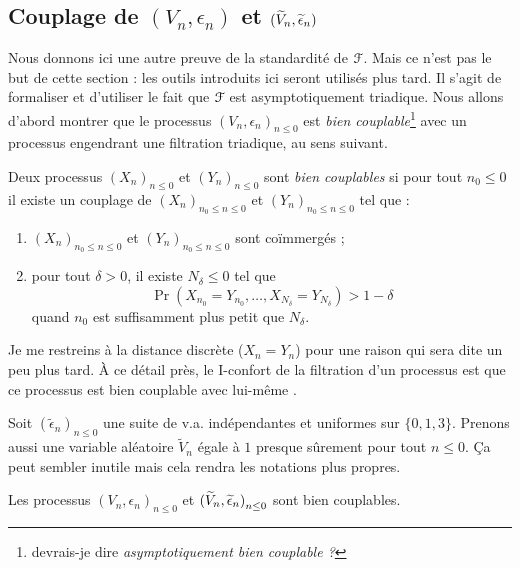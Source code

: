 \documentclass[12pt,a4paper]{article}
\begin{document}
\subsection{Couplage de $(V_n,\epsilon_n)$ et $(\widetilde{V}_n, \widetilde{\epsilon}_n)$}

Nous donnons ici une autre preuve de la standardité de $\EuScript{F}$. 
Mais ce n'est pas le but de cette section : 
les outils introduits ici seront utilisés plus tard.  
Il s'agit de formaliser et d'utiliser le fait que $\EuScript{F}$ est asymptotiquement 
triadique. 
Nous allons d'abord montrer que le processus ${(V_n, \epsilon_n)}_{n \leq 0}$ 
est \emph{bien couplable}\footnote{devrais-je dire \emph{asymptotiquement bien couplable ?}} 
avec un processus engendrant une filtration triadique, 
au sens suivant.

\begin{definition}
Deux processus  ${(X_n)}_{n \leq 0}$ et ${(Y_n)}_{n \leq 0}$ sont \emph{bien couplables}  
si pour tout $n_0 \leq 0$ il existe un couplage de 
${(X_n)}_{n_0 \leq n \leq 0}$ et ${(Y_n)}_{n_0 \leq n \leq 0}$ tel que :
\begin{enumerate}
\item ${(X_n)}_{n_0 \leq n \leq 0}$ et ${(Y_n)}_{n_0 \leq n \leq 0}$ 
sont co\"immergés ; 

\item  pour tout $\delta >0$, il existe $N_\delta \leq 0$ tel que   
$$
\Pr(X_{n_0}=Y_{n_0}, \ldots, X_{N_\delta}=Y_{N_\delta}) > 1-\delta 
$$
quand $n_0$ est suffisamment plus petit que $N_\delta$.
\end{enumerate} 
\end{definition}

\begin{remarque}
Je me restreins à la distance discrète ($X_n=Y_n$) pour une raison qui sera 
dite un peu plus tard. À ce détail près, le I-confort de la filtration 
d'un processus est que ce processus est \og bien couplable avec lui-même \fg.
\end{remarque}

Soit ${(\widetilde{\epsilon}_n)}_{n \leq 0}$ une suite de v.a. indépendantes 
et uniformes sur $\{0,1,3\}$. 
 Prenons aussi une variable aléatoire $\widetilde{V}_n$ égale à $1$ 
presque sûrement pour tout $n \leq 0$. Ça peut sembler inutile mais 
cela rendra les notations plus propres. 

\begin{lemme}\label{lemme:joining_epsilon}
Les processus 
${(V_n, \epsilon_n)}_{n \leq 0}$ et 
 ${(\widetilde{V}_n, \widetilde{\epsilon}_n)}_{n \leq 0}$ sont bien couplables. 
\end{lemme}
\end{document}
